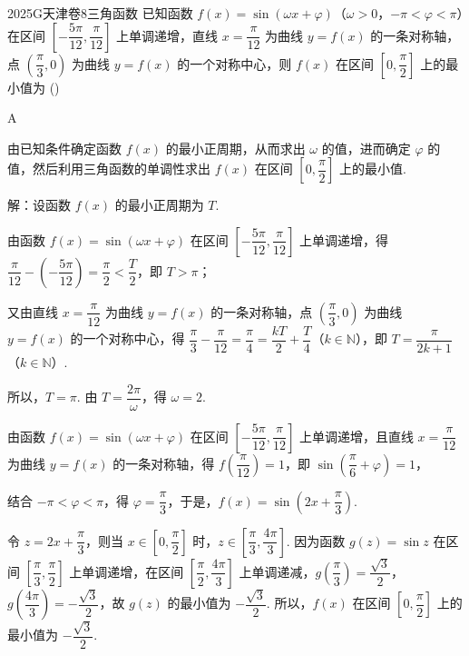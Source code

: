 
\begin{problem}{2025}{G}{天津卷}{8}{三角函数}
已知函数 $ f(x)=\sin(\omega x+\varphi) $（$ \omega>0 $，$ -\pi<\varphi<\pi $）在区间 $ \left[-\dfrac{5\pi}{12},\dfrac{\pi}{12}\right] $ 上单调递增，直线 $ x=\dfrac{\pi}{12} $ 为曲线 $ y=f(x) $ 的一条对称轴，点 $ \left(\dfrac{\pi}{3},0\right) $ 为曲线 $ y=f(x) $ 的一个对称中心，则 $ f(x) $ 在区间 $ \left[0,\dfrac{\pi}{2}\right] $ 上的最小值为 (\hspace{1cm})
\begin{choices}
\end{choices}
\end{problem}

\begin{answer}
A
\end{answer}

\begin{solutions}
由已知条件确定函数 $ f(x) $ 的最小正周期，从而求出 $ \omega $ 的值，进而确定 $ \varphi $ 的值，然后利用三角函数的单调性求出 $ f(x) $ 在区间 $ \left[0,\dfrac{\pi}{2}\right] $ 上的最小值.

解：设函数 $ f(x) $ 的最小正周期为 $ T $.

由函数 $ f(x)=\sin(\omega x+\varphi) $ 在区间 $ \left[-\dfrac{5\pi}{12},\dfrac{\pi}{12}\right] $ 上单调递增，得 $ \dfrac{\pi}{12}-\left(-\dfrac{5\pi}{12}\right)=\dfrac{\pi}{2}<\dfrac{T}{2} $，即 $ T>\pi $；

又由直线 $ x=\dfrac{\pi}{12} $ 为曲线 $ y=f(x) $ 的一条对称轴，点 $ \left(\dfrac{\pi}{3},0\right) $ 为曲线 $ y=f(x) $ 的一个对称中心，得 $ \dfrac{\pi}{3}-\dfrac{\pi}{12}=\dfrac{\pi}{4}=\dfrac{kT}{2}+\dfrac{T}{4} $（$ k\in\mathbb{N} $），即 $ T=\dfrac{\pi}{2k+1} $（$ k\in\mathbb{N} $）.

所以，$ T=\pi $. 由 $ T=\dfrac{2\pi}{\omega} $，得 $ \omega=2 $.

由函数 $ f(x)=\sin(\omega x+\varphi) $ 在区间 $ \left[-\dfrac{5\pi}{12},\dfrac{\pi}{12}\right] $ 上单调递增，且直线 $ x=\dfrac{\pi}{12} $ 为曲线 $ y=f(x) $ 的一条对称轴，得 $ f\left(\dfrac{\pi}{12}\right)=1 $，即 $ \sin\left(\dfrac{\pi}{6}+\varphi\right)=1 $，

结合 $ -\pi<\varphi<\pi $，得 $ \varphi=\dfrac{\pi}{3} $，于是，$ f(x)=\sin\left(2x+\dfrac{\pi}{3}\right) $.

令 $ z=2x+\dfrac{\pi}{3} $，则当 $ x\in\left[0,\dfrac{\pi}{2}\right] $ 时，$ z\in\left[\dfrac{\pi}{3},\dfrac{4\pi}{3}\right] $. 因为函数 $ g(z)=\sin z $ 在区间 $ \left[\dfrac{\pi}{3},\dfrac{\pi}{2}\right] $ 上单调递增，在区间 $ \left[\dfrac{\pi}{2},\dfrac{4\pi}{3}\right] $ 上单调递减，$ g\left(\dfrac{\pi}{3}\right)=\dfrac{\sqrt{3}}{2} $，$ g\left(\dfrac{4\pi}{3}\right)=-\dfrac{\sqrt{3}}{2} $，故 $ g(z) $ 的最小值为 $ -\dfrac{\sqrt{3}}{2} $. 所以，$ f(x) $ 在区间 $ \left[0,\dfrac{\pi}{2}\right] $ 上的最小值为 $ -\dfrac{\sqrt{3}}{2} $.
\end{solutions}